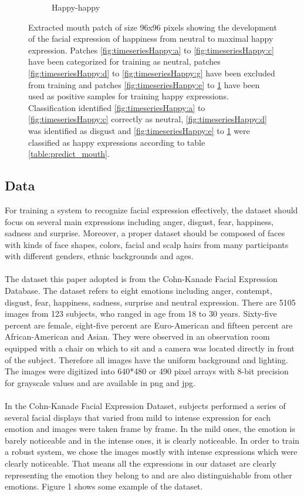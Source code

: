 \begin{figure}
\begin{subfigure}[b]{0.15\textwidth}
		\caption{Happy-happy}
		\label{fig:timeseriesHappy:m}
	\end{subfigure}
	\caption[Complete time series of happy mouth patches]{Extracted mouth patch of size 96x96 pixels showing the development of
	the facial expression of happiness from neutral to maximal happy expression.
	Patches \ref{fig:timeseriesHappy:a} to \ref{fig:timeseriesHappy:c} have been
	categorized for training as neutral, patches \ref{fig:timeseriesHappy:d} to
	\ref{fig:timeseriesHappy:g} have been excluded from training and patches
	\ref{fig:timeseriesHappy:e} to \ref{fig:timeseriesHappy:m} have been used as
	positive samples for training happy expressions. Classification identified
	\ref{fig:timeseriesHappy:a} to \ref{fig:timeseriesHappy:c} correctly as
	neutral, \ref{fig:timeseriesHappy:d} was identified as disgust and
	\ref{fig:timeseriesHappy:e} to \ref{fig:timeseriesHappy:m} were classified as
	happy expressions according to table \ref{table:predict_mouth}.}
	\label{fig:timeseriesHappy}
\end{figure}


\subsection{Data}
For training a system to recognize facial expression effectively, the dataset should focus on several main expressions including anger, disgust, fear, happiness, sadness and surprise. Moreover, a proper dataset should be composed of faces with kinds of face shapes, colors, facial and scalp hairs from many participants with different genders, ethnic backgrounds and ages. 
\\
\\
The dataset this paper adopted is from the Cohn-Kanade Facial Expression Database. The dataset refers to eight emotions including anger, contempt, disgust, fear, happiness, sadness, surprise and neutral expression. There are 5105 images from 123 subjects, who ranged in age from 18 to 30 years. Sixty-five percent are female, eight-five percent are Euro-American and fifteen percent are African-American and Asian. They were observed in an observation room equipped with a chair on which to sit and a camera was located directly in front of the subject. Therefore all images have the uniform background and lighting. The images were digitized into 640*480 or 490 pixel arrays with 8-bit precision for grayscale values and are available in png and jpg. 
\\
\\
In the Cohn-Kanade Facial Expression Dataset, subjects performed a series of several facial displays that varied from mild to intense expression for each emotion and images were taken frame by frame. In the mild ones, the emotion is barely noticeable and in the intense ones, it is clearly noticeable. In order to train a robust system, we chose the images mostly with intense expressions which were clearly noticeable. That means all the expressions in our dataset are clearly representing the emotion they belong to and are also distinguishable from other emotions. Figure 1 shows some example of the dataset.


